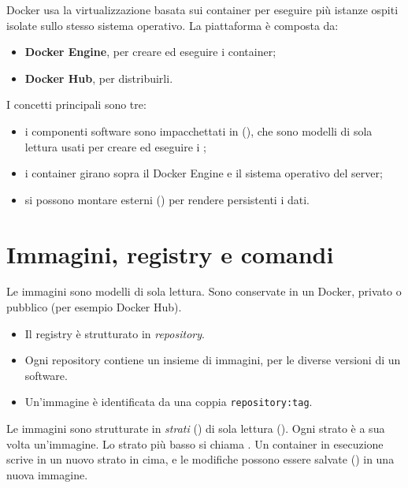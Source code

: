 Docker usa la virtualizzazione basata sui container per eseguire più istanze ospiti isolate sullo stesso sistema
operativo. La piattaforma è composta da:
\begin{itemize}
  \item \textbf{Docker Engine}, per creare ed eseguire i container;
  \item \textbf{Docker Hub}, per distribuirli.
\end{itemize}

I concetti principali sono tre:
\begin{itemize}
  \item i componenti software sono impacchettati in  (), che sono modelli di sola
    lettura usati per creare ed eseguire i ;
  \item i container girano sopra il Docker Engine e il sistema operativo del server;
  \item si possono montare  esterni () per rendere persistenti i dati.
\end{itemize}

\section{Immagini, registry e comandi}
\label{sec:container-immagini}

Le immagini sono modelli di sola lettura. Sono conservate in un  Docker, privato o pubblico
(per esempio Docker Hub).
\begin{itemize}
  \item Il registry è strutturato in \emph{repository}.
  \item Ogni repository contiene un insieme di immagini, per le diverse versioni di un software.
  \item Un'immagine è identificata da una coppia \texttt{repository:tag}.
\end{itemize}

Le immagini sono strutturate in \emph{strati} () di sola lettura (). Ogni
strato è a sua volta un'immagine. Lo strato più basso si chiama . Un container in esecuzione scrive
in un nuovo strato in cima, e le modifiche possono essere salvate () in una nuova immagine.

